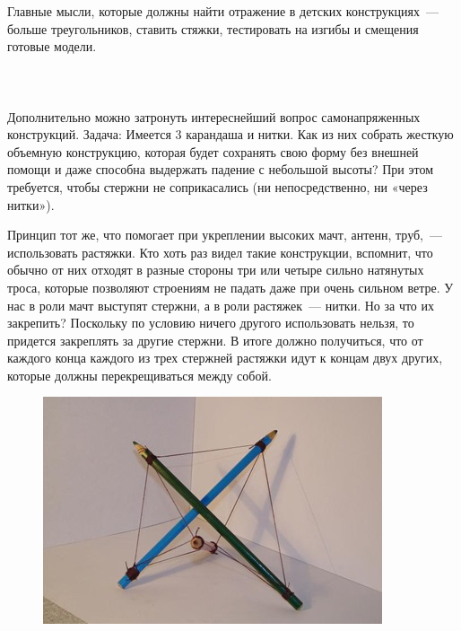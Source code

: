 Главные мысли, которые должны найти отражение в детских конструкциях~--- больше треугольников, ставить стяжки, тестировать на изгибы и смещения готовые модели.\\\\

{\hypertarget{lesson19x6}{}}\\\\

Дополнительно можно затронуть интереснейший вопрос самонапряженных конструкций.
Задача: Имеется  3 карандаша и нитки. Как из них собрать жесткую объемную конструкцию, которая будет сохранять свою форму без внешней помощи и даже способна выдержать падение с небольшой высоты? При этом требуется, чтобы стержни не соприкасались (ни непосредственно, ни «через нитки»).

Принцип тот же, что помогает при укреплении высоких мачт, антенн, труб,~--- использовать растяжки. Кто хоть раз видел такие конструкции, вспомнит, что обычно от них отходят в разные стороны три или четыре сильно натянутых троса, которые позволяют строениям не падать даже при очень сильном ветре. У нас в роли мачт выступят стержни, а в роли растяжек~--- нитки. Но за что их закрепить? Поскольку по условию ничего другого использовать нельзя, то придется закреплять за другие стержни. В итоге должно получиться, что от каждого конца каждого из трех стержней растяжки идут к концам двух других, которые должны перекрещиваться между собой.

\begin{figure}[h!]
	\begin{center}
		\includegraphics[width=1\linewidth]{chapters/chapter19/images/3}
		\caption{}
		\label{ris:image19x3}
	\end{center}
\end{figure}	

